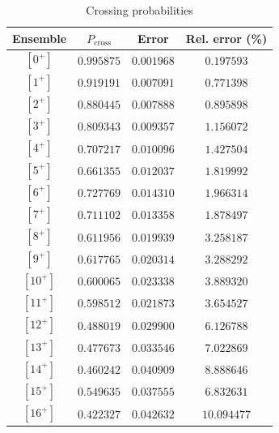 \documentclass[a4paper]{article}
\begin{document}
\begin{longtable}{| c | c | c | c |}
\caption{Crossing probabilities}\\
\hline
Ensemble & $P_\text{cross}$ & Error & Rel. error (\%)\\ \hline
$ [0^+]  $ & $ 0.995875 $ & $ 0.001968 $ & $ 0.197593 $\\
$ [1^+]  $ & $ 0.919191 $ & $ 0.007091 $ & $ 0.771398 $\\
$ [2^+]  $ & $ 0.880445 $ & $ 0.007888 $ & $ 0.895898 $\\
$ [3^+]  $ & $ 0.809343 $ & $ 0.009357 $ & $ 1.156072 $\\
$ [4^+]  $ & $ 0.707217 $ & $ 0.010096 $ & $ 1.427504 $\\
$ [5^+]  $ & $ 0.661355 $ & $ 0.012037 $ & $ 1.819992 $\\
$ [6^+]  $ & $ 0.727769 $ & $ 0.014310 $ & $ 1.966314 $\\
$ [7^+]  $ & $ 0.711102 $ & $ 0.013358 $ & $ 1.878497 $\\
$ [8^+]  $ & $ 0.611956 $ & $ 0.019939 $ & $ 3.258187 $\\
$ [9^+]  $ & $ 0.617765 $ & $ 0.020314 $ & $ 3.288292 $\\
$ [10^+] $ & $ 0.600065 $ & $ 0.023338 $ & $ 3.889320 $\\
$ [11^+] $ & $ 0.598512 $ & $ 0.021873 $ & $ 3.654527 $\\
$ [12^+] $ & $ 0.488019 $ & $ 0.029900 $ & $ 6.126788 $\\
$ [13^+] $ & $ 0.477673 $ & $ 0.033546 $ & $ 7.022869 $\\
$ [14^+] $ & $ 0.460242 $ & $ 0.040909 $ & $ 8.888646 $\\
$ [15^+] $ & $ 0.549635 $ & $ 0.037555 $ & $ 6.832631 $\\
$ [16^+] $ & $ 0.422327 $ & $ 0.042632 $ & $10.094477 $\\
\hline
\end{longtable}
\end{document}

